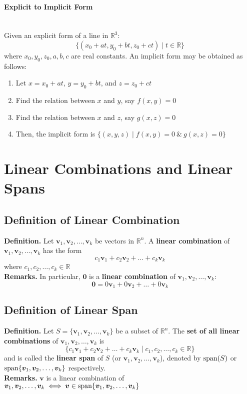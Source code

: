 \documentclass[../ma2001_notes.tex]{subfiles}
\begin{document}
\paragraph{Explicit to Implicit Form}\,\\
Given an explicit form of a line in \(\mathbb{R}^3\):
\[\{(x_0+at, y_0+bt, z_0+ct)\mid t\in\mathbb{R}\}\]
where \(x_0,y_0,z_0,a,b,c\) are real constants. An implicit form may be obtained as follows:
\begin{enumerate}
	\item Let \(x=x_0+at\), \(y=y_0+bt\), and \(z=z_0+ct\)
	\item Find the relation between \(x\) and \(y\), say \(f(x,y)=0\)
	\item Find the relation between \(x\) and \(z\), say \(g(x,z)=0\)
	\item Then, the implicit form is \(\{(x,y,z)\mid f(x,y)=0\ \&\ g(x,z)=0\}\)
\end{enumerate}

\section{Linear Combinations and Linear Spans}
\subsection{Definition of Linear Combination}
\textbf{Definition.} Let \(\bm{v}_1,\bm{v}_2,\ldots,\bm{v}_k\) be vectors in \(\mathbb{R}^n\). A \textbf{linear combination} of \(\bm{v}_1,\bm{v}_2,\ldots,\bm{v}_k\) has the form
\[c_1\bm{v}_1+c_2\bm{v}_2+\ldots+c_k\bm{v}_k\]
where \(c_1,c_2,\ldots,c_k\in\mathbb{R}\) \\
\textbf{Remarks.} In particular, \(\bm{0}\) is a \textbf{linear combination} of \(\bm{v}_1,\bm{v}_2,\ldots,\bm{v}_k\):
\[\bm{0}=0\bm{v}_1+0\bm{v}_2+\ldots+0\bm{v}_k\]

\subsection{Definition of Linear Span}
\textbf{Definition.} Let \(S=\{\bm{v}_1,\bm{v}_2,\ldots,\bm{v}_k\}\) be a subset of \(\mathbb{R}^n\). The \textbf{set of all linear combinations} of \(\bm{v}_1,\bm{v}_2,\ldots,\bm{v}_k\) is
\[\{c_1\bm{v}_1+c_2\bm{v}_2+\ldots+c_k\bm{v}_k\mid c_1,c_2,\ldots,c_k\in\mathbb{R}\}\]
and is called the \textbf{linear span} of \(S\) (or \(\bm{v}_1,\bm{v}_2,\ldots,\bm{v}_k\)), denoted by \(\operatorname{span}(S)\) or \(\operatorname{span}\{\bm{v}_1,\bm{v}_2,\ldots,\bm{v}_k\}\) respectively. \\
\textbf{Remarks.} \(\bm{v}\) is a linear combination of \(\bm{v}_1,\bm{v}_2,\ldots,\bm{v}_k\iff\bm{v}\in\operatorname{span}\{\bm{v}_1,\bm{v}_2,\ldots,\bm{v}_k\}\)
\end{document}
